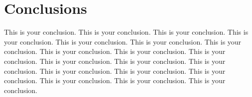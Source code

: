 \chapter{Conclusions}
\label{c:conclusion}

This is your conclusion. This is your conclusion. This is your conclusion. This is your conclusion. This is your conclusion. This is your conclusion. This is your conclusion. This is your conclusion. This is your conclusion. This is your conclusion. This is your conclusion. This is your conclusion. This is your conclusion. This is your conclusion. This is your conclusion. This is your conclusion. This is your conclusion. This is your conclusion. This is your conclusion. 